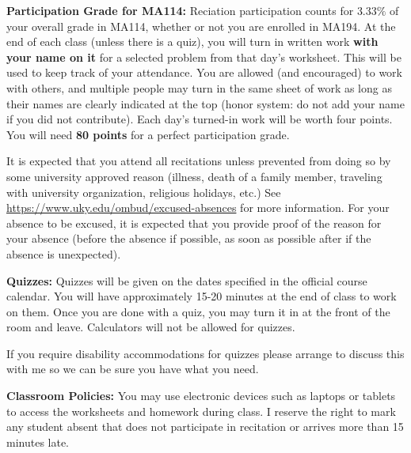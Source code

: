 \documentclass[12pt]{article}
\newcommand{\tbf}[1]{\noindent\textbf{#1}}
\begin{document}
\tbf{Participation Grade for MA114:}
Reciation participation counts for $3.33\%$ of your overall grade in MA114, whether or not you are enrolled in MA194. At the end of each class (unless there is a quiz), you will turn in written work \textbf{with your name on it} for a selected problem from that day's worksheet. This will be used to keep track of your attendance. You are allowed (and encouraged) to work with others, and multiple people may turn in the same sheet of work as long as their names are clearly indicated at the top (honor system: do not add your name if you did not contribute). Each day's turned-in work will be worth four points. You will need \textbf{80 points} for a perfect participation grade. \par
It is expected that you attend all recitations unless prevented from doing so by some university approved reason (illness, death of a family member, traveling with university organization, religious holidays, etc.) See \url{https://www.uky.edu/ombud/excused-absences} for more information. For your absence to be excused, it is expected that you provide proof of the reason for your absence (before the absence if possible, as soon as possible after if the absence is unexpected).

\vspace{0.5cm}

\tbf{Quizzes:}
Quizzes will be given on the dates specified in the official course calendar. You will have approximately 15-20 minutes at the end of class to work on them. Once you are done with a quiz, you may turn it in at the front of the room and leave. Calculators will not be allowed for quizzes. \par If you require disability accommodations for quizzes please arrange to discuss this with me so we can be sure you have what you need.

\vspace{0.5cm}

\tbf{Classroom Policies:}
You may use electronic devices such as laptops or tablets to access the worksheets and homework during class. I reserve the right to mark any student absent that does not participate in recitation or arrives more than 15 minutes late.
\end{document}
